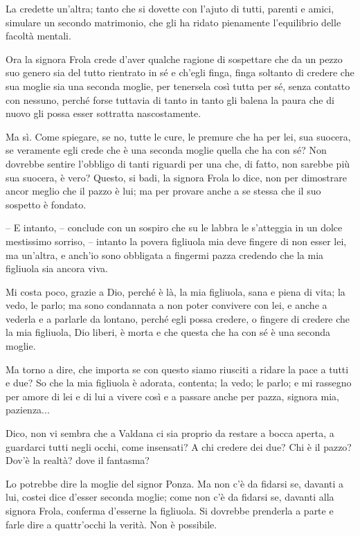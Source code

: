 \documentclass[12pt]{book}
\begin{document}
 La credette un’altra; tanto che si dovette con l’ajuto di tutti, parenti e amici, simulare un secondo matrimonio, che gli ha ridato pienamente l’equilibrio delle facoltà mentali.

Ora la signora Frola crede d’aver qualche ragione di sospettare che da un pezzo suo genero sia del tutto rientrato in sé e ch’egli finga, finga soltanto di credere che sua moglie sia una seconda moglie, per tenersela così tutta per sé, senza contatto con nessuno, perché forse tuttavia di tanto in tanto gli balena la paura che di nuovo gli possa esser sottratta nascostamente. 

Ma sì. Come spiegare, se no, tutte le cure, le premure che ha per lei, sua suocera, se veramente egli crede che è una seconda moglie quella che ha con sé? Non dovrebbe sentire l’obbligo di tanti riguardi per una che, di fatto, non sarebbe più sua suocera, è vero? Questo, si badi, la signora Frola lo dice, non per dimostrare ancor meglio che il pazzo è lui; ma per provare anche a se stessa che il suo sospetto è fondato.

– E intanto, – conclude con un sospiro che su le labbra le s’atteggia in un dolce mestissimo sorriso, – intanto la povera figliuola mia deve fingere di non esser lei, ma un’altra, e anch’io sono obbligata a fingermi pazza credendo che la mia figliuola sia ancora viva. 

Mi costa poco, grazie a Dio, perché è là, la mia figliuola, sana e piena di vita; la vedo, le parlo; ma sono condannata a non poter convivere con lei, e anche a vederla e a parlarle da lontano, perché egli possa credere, o fingere di credere che la mia figliuola, Dio liberi, è morta e che questa che ha con sé è una seconda moglie. 

Ma torno a dire, che importa se con questo siamo riusciti a ridare la pace a tutti e due? So che la mia figliuola è adorata, contenta; la vedo; le parlo; e mi rassegno per amore di lei e di lui a vivere così e a passare anche per pazza, signora mia, pazienza...

Dico, non vi sembra che a Valdana ci sia proprio da restare a bocca aperta, a guardarci tutti negli occhi, come insensati? A chi credere dei due? Chi è il pazzo? Dov’è la realtà? dove il fantasma?

Lo potrebbe dire la moglie del signor Ponza. Ma non c’è da fidarsi se, davanti a lui, costei dice d’esser seconda moglie; come non c’è da fidarsi se, davanti alla signora Frola, conferma d’esserne la figliuola. Si dovrebbe prenderla a parte e farle dire a quattr’occhi la verità. Non è possibile.
\end{document}
